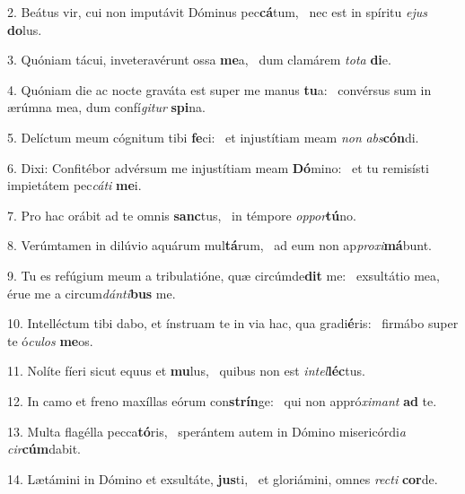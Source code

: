 2. Beátus vir, cui non imputávit Dóminus pec\textbf{cá}tum, \ast\  nec est in spíritu \textit{e}\textit{jus} \textbf{do}lus.\

3. Quóniam tácui, inveteravérunt ossa \textbf{me}a, \ast\  dum clamárem \textit{to}\textit{ta} \textbf{di}e.\

4. Quóniam die ac nocte graváta est super me manus \textbf{tu}a: \ast\  convérsus sum in ærúmna mea, dum confí\textit{gi}\textit{tur} \textbf{spi}na.\

5. Delíctum meum cógnitum tibi \textbf{fe}ci: \ast\  et injustítiam meam \textit{non} \textit{abs}\textbf{cón}di.\

6. Dixi: Confitébor advérsum me injustítiam meam \textbf{Dó}mino: \ast\  et tu remisísti impietátem pec\textit{cá}\textit{ti} \textbf{me}i.\

7. Pro hac orábit ad te omnis \textbf{sanc}tus, \ast\  in témpore \textit{op}\textit{por}\textbf{tú}no.\

8. Verúmtamen in dilúvio aquárum mul\textbf{tá}rum, \ast\  ad eum non ap\textit{pro}\textit{xi}\textbf{má}bunt.\

9. Tu es refúgium meum a tribulatióne, quæ circúmde\textbf{dit} me: \ast\  exsultátio mea, érue me a circum\textit{dán}\textit{ti}\textbf{bus} me.\

10. Intelléctum tibi dabo, et ínstruam te in via hac, qua gradi\textbf{é}ris: \ast\  firmábo super te ó\textit{cu}\textit{los} \textbf{me}os.\

11. Nolíte fíeri sicut equus et \textbf{mu}lus, \ast\  quibus non est \textit{in}\textit{tel}\textbf{léc}tus.\

12. In camo et freno maxíllas eórum con\textbf{strín}ge: \ast\  qui non appró\textit{xi}\textit{mant} \textbf{ad} te.\

13. Multa flagélla pecca\textbf{tó}ris, \ast\  sperántem autem in Dómino misericórdi\textit{a} \textit{cir}\textbf{cúm}dabit.\

14. Lætámini in Dómino et exsultáte, \textbf{jus}ti, \ast\  et gloriámini, omnes \textit{rec}\textit{ti} \textbf{cor}de.\

